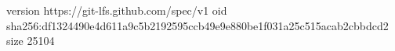version https://git-lfs.github.com/spec/v1
oid sha256:df1324490e4d611a9c5b2192595ccb49e9e880be1f031a25c515acab2cbbdcd2
size 25104
